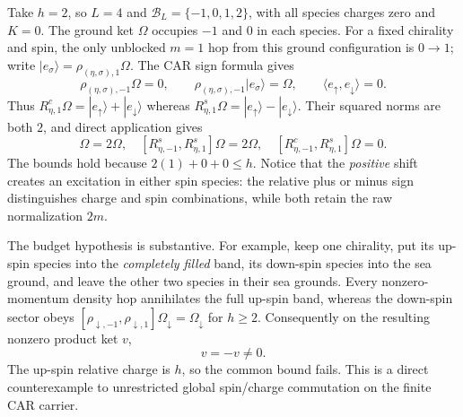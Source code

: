 \begin{example}
\label{ex:ch21-first-mode}
Take $h=2$, so $L=4$ and
$\mathcal B_L=\{-1,0,1,2\}$, with all species charges zero and
$K=0$.  The ground ket $\Omega$ occupies $-1$ and $0$ in each
species.  For a fixed chirality and spin, the only unblocked
$m=1$ hop from this ground configuration is $0\to1$; write
$|e_\sigma\rangle=\rho_{(\eta,\sigma),1}\Omega$.
The CAR sign formula gives
\begin{equation*}
 \rho_{(\eta,\sigma),-1}\Omega=0,
 \qquad \rho_{(\eta,\sigma),-1}|e_\sigma\rangle=\Omega,
 \qquad \langle e_\uparrow,e_\downarrow\rangle=0.
\end{equation*}
Thus $R^c_{\eta,1}\Omega=|e_\uparrow\rangle+|e_\downarrow\rangle$
whereas $R^s_{\eta,1}\Omega=|e_\uparrow\rangle-|e_\downarrow\rangle$.
Their squared norms are both $2$, and direct application gives
\begin{equation}
 [R^c_{\eta,-1},R^c_{\eta,1}]\Omega=2\Omega,
 \quad [R^s_{\eta,-1},R^s_{\eta,1}]\Omega=2\Omega,
 \quad [R^c_{\eta,-1},R^s_{\eta,1}]\Omega=0.
 \label{eq:ch21-example-two}
\end{equation}
The bounds hold because $2(1)+0+0\leq h$.  Notice that the
\emph{positive} shift creates an excitation in either spin species:
the relative plus or minus sign distinguishes charge and spin
combinations, while both retain the raw normalization $2m$.
\end{example}

The budget hypothesis is substantive.  For example, keep one chirality,
put its up-spin species into the \emph{completely filled} band, its
down-spin species into the sea ground, and leave the other two species
in their sea grounds.  Every nonzero-momentum density hop annihilates
the full up-spin band, whereas the down-spin sector obeys
$[\rho_{\downarrow,-1},\rho_{\downarrow,1}]\Omega_\downarrow
 =\Omega_\downarrow$ for $h\geq2$.  Consequently on the resulting
nonzero product ket $v$,
\begin{equation}
  [R^c_{\eta,-1},R^s_{\eta,1}]v=-v\ne0.
  \label{eq:ch21-off-margin-example}
\end{equation}
The up-spin relative charge is $h$, so the common bound fails.
This is a direct counterexample to unrestricted global spin/charge
commutation on the finite CAR carrier.

